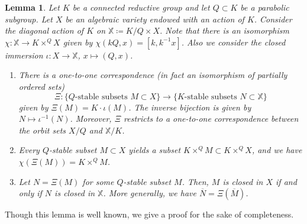 \documentclass[11pt]{article}
\newtheorem{lemma}[theo]{Lemma}
\theoremstyle{definition}
\numberwithin{equation}{section}
\begin{document}
\begin{lemma}
\label{L3.2-new}
Let $K$ be a connected reductive group and let $Q\subset K$ be a parabolic subgroup. Let $X$ be an algebraic variety endowed with an action of $K$. Consider the diagonal action of $K$ on $\mathbb{X}\coloneqq K/Q\times X$.
Note that there is an isomorphism  $\chi:\mathbb{X}\to K\times^QX$ given by $\chi(kQ,x)=[k,k^{-1}x]$.
Also we consider the closed immersion $\iota:X\to\mathbb{X}$, $x\mapsto(Q,x)$.
\begin{enumerate}
\item There is a one-to-one correspondence (in fact an isomorphism of partially ordered sets)
\[\Xi:\{\mbox{$Q$-stable subsets $M\subset X$}\}\to\{\mbox{$K$-stable subsets $N\subset\mathbb{X}$}\}\]
given by $\Xi(M)=K\cdot\iota(M)$. The inverse bijection is given by $N\mapsto\iota^{-1}(N)$. Moreover, $\Xi$ restricts to a one-to-one correspondence between the orbit sets $X/Q$ and $\mathbb{X}/K$.
\item Every $Q$-stable subset $M\subset X$ yields a subset $K\times^QM\subset K\times^QX$, and we have $\chi(\Xi(M))=K\times^QM$.
\item Let $N=\Xi(M)$ for some $Q$-stable subset $M$. Then, $M$ is closed in $X$ if and only if $N$ is closed in $\mathbb{X}$. More generally, we have $\overline{N}=\Xi(\overline{M})$.
\end{enumerate}
\end{lemma}

Though this lemma is well known, we give a proof for the sake of completeness.
\end{document}
